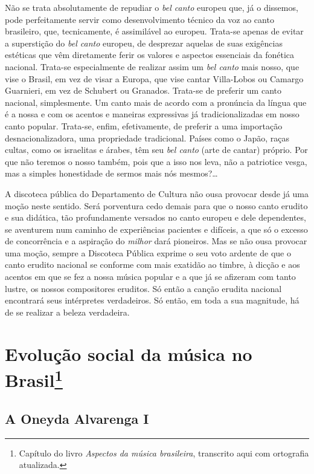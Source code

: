 Não se trata absolutamente de repudiar o \textit{bel canto} europeu que, já o
dissemos, pode perfeitamente servir como desenvolvimento técnico da voz
ao canto brasileiro, que, tecnicamente, é assimilável ao europeu.
Trata-se apenas de evitar a superstição do \textit{bel canto} europeu, de
desprezar aquelas de suas exigências estéticas que vêm diretamente ferir
os valores e aspectos essenciais da fonética nacional. Trata-se
especialmente de realizar assim um \textit{bel canto} mais nosso, que vise o
Brasil, em vez de visar a Europa, que vise cantar Villa-Lobos ou Camargo
Guarnieri, em vez de Schubert ou Granados. Trata-se de preferir um canto
nacional, simplesmente. Um canto mais de acordo com a pronúncia da
língua que é a nossa e com os acentos e maneiras expressivas já
tradicionalizadas em nosso canto popular. Trata-se, enfim, efetivamente,
de preferir a uma importação desnacionalizadora, uma propriedade
tradicional. Países como o Japão, raças cultas, como os israelitas e
árabes, têm seu \textit{bel canto} (arte de cantar) próprio. Por que não teremos
o nosso também, pois que a isso nos leva, não a patriotice vesga, mas a
simples honestidade de sermos mais nós mesmos?\ldots{}

A discoteca pública do Departamento de Cultura não ousa provocar desde
já uma moção neste sentido. Será porventura cedo demais para que o nosso
canto erudito e sua didática, tão profundamente versados no canto
europeu e dele dependentes, se aventurem num caminho de experiências
pacientes e difíceis, a que só o excesso de concorrência e a aspiração
do \textit{milhor} dará pioneiros. Mas se não ousa provocar uma moção, sempre a
Discoteca Pública exprime o seu voto ardente de que o canto erudito
nacional se conforme com mais exatidão ao timbre, à dicção e aos acentos
em que se fez a nossa música popular e a que já se afizeram com tanto
lustre, os nossos compositores eruditos. Só então a canção erudita
nacional encontrará seus intérpretes verdadeiros. Só então, em toda a
sua magnitude, há de se realizar a beleza verdadeira.


\chapter{Evolução social da música no Brasil\footnote{Capítulo do livro \textit{Aspectos da música brasileira}, transcrito aqui com ortografia atualizada.}}

\section*{A Oneyda Alvarenga I}

